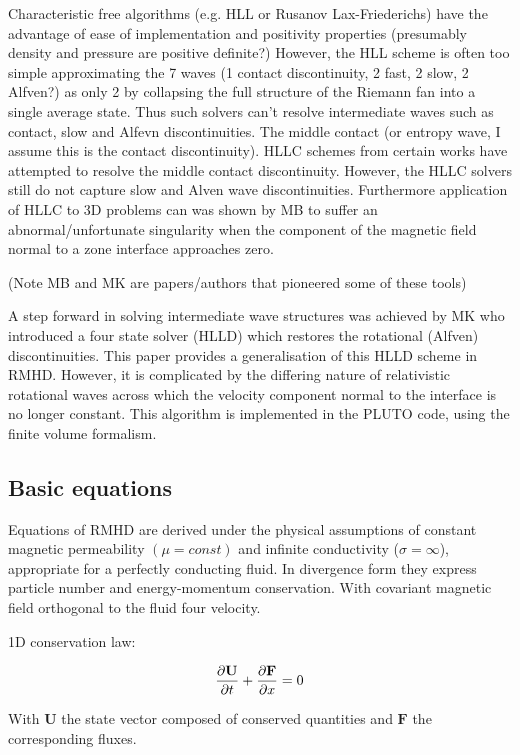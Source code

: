 \documentclass{article}
\begin{document}
Characteristic free algorithms (e.g. HLL or Rusanov Lax-Friederichs) have the advantage of ease of implementation and positivity properties (presumably density and pressure are positive definite?) However, the HLL scheme is often too simple approximating the 7 waves (1 contact discontinuity, 2 fast, 2 slow, 2 Alfven?) as only 2 by collapsing the full structure of the Riemann fan into a single average state. Thus such solvers can't resolve intermediate waves such as contact, slow and Alfevn discontinuities. The middle contact (or entropy wave, I assume this is the contact discontinuity). HLLC schemes from certain works have attempted to resolve the middle contact discontinuity. However, the HLLC solvers still do not capture slow and Alven wave discontinuities. Furthermore application of HLLC to 3D problems can was shown by MB to suffer an abnormal/unfortunate singularity when the component of the magnetic field normal to a zone interface approaches zero. 

(Note MB and MK are papers/authors that pioneered some of these tools) 

A step forward in solving intermediate wave structures was achieved by MK who introduced a four state solver (HLLD) which restores the rotational (Alfven) discontinuities. This paper provides a generalisation of this HLLD scheme in RMHD. However, it is complicated by the differing nature of relativistic rotational waves across which the velocity component normal to the interface is no longer constant. This algorithm is implemented in the PLUTO code, using the finite volume formalism. 

\subsection{Basic equations}

Equations of RMHD are derived under the physical assumptions of constant magnetic permeability $(\mu=const)$ and infinite conductivity ($\sigma=\infty$), appropriate for a perfectly conducting fluid. In divergence form they express particle number and energy-momentum conservation. With covariant magnetic field orthogonal to the fluid four velocity. 

1D conservation law:

\begin{align}
    \pdv{\mathbf{U}}{t}+\pdv{\mathbf{F}}{x}=0
\end{align}

With $\mathbf{U}$ the state vector composed of conserved quantities and $\mathbf{F}$ the corresponding fluxes. 
\end{document}
